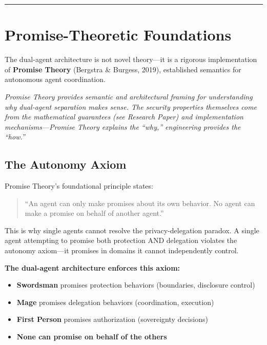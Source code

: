 \documentclass[
]{article}
\providecommand{\tightlist}{%
  \setlength{\itemsep}{0pt}\setlength{\parskip}{0pt}}
\begin{document}
\begin{center}\rule{0.5\linewidth}{0.5pt}\end{center}

\section{Promise-Theoretic
Foundations}\label{promise-theoretic-foundations}

The dual-agent architecture is not novel theory---it is a rigorous
implementation of \textbf{Promise Theory} (Bergstra \& Burgess, 2019),
established semantics for autonomous agent coordination.

\emph{Promise Theory provides semantic and architectural framing for
understanding why dual-agent separation makes sense. The security
properties themselves come from the mathematical guarantees (see
Research Paper) and implementation mechanisms---Promise Theory explains
the ``why,'' engineering provides the ``how.''}

\subsection{The Autonomy Axiom}\label{the-autonomy-axiom}

Promise Theory's foundational principle states:

\begin{quote}
``An agent can only make promises about its own behavior. No agent can
make a promise on behalf of another agent.''
\end{quote}

This is why single agents cannot resolve the privacy-delegation paradox.
A single agent attempting to promise both protection AND delegation
violates the autonomy axiom---it promises in domains it cannot
independently control.

\textbf{The dual-agent architecture enforces this axiom:}

\begin{itemize}
\tightlist
\item
  \textbf{Swordsman} promises protection behaviors (boundaries,
  disclosure control)
\item
  \textbf{Mage} promises delegation behaviors (coordination, execution)
\item
  \textbf{First Person} promises authorization (sovereignty decisions)
\item
  \textbf{None can promise on behalf of the others}
\end{itemize}
\end{document}
